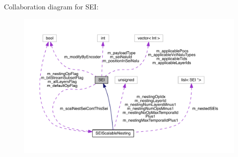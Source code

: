 Collaboration diagram for S\+EI\+:
\nopagebreak
\begin{figure}[H]
\begin{center}
\leavevmode
\includegraphics[width=350pt]{d3/d5a/class_s_e_i__coll__graph}
\end{center}
\end{figure}
